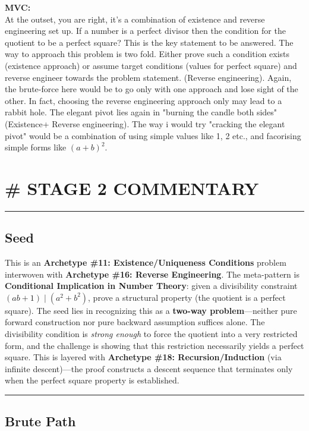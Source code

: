 \documentclass{article}
\begin{document}
\noindent \textbf{MVC:} \\
At the outset, you are right, it's a combination of existence and reverse engineering set up. If a number is a perfect divisor then the condition for the quotient to be a perfect square? This is the key statement to be answered. The way to approach this problem is two fold. Either prove such a condition exists (existence approach) or assume target conditions (values for perfect square) and reverse engineer towards the problem statement. (Reverse engineering). Again, the brute-force here would be to go only with one approach and lose sight of the other. In fact, choosing the reverse engineering approach only may lead to a rabbit hole. The elegant pivot lies again in "burning the candle both sides" (Existence+ Reverse engineering). The way i would try "cracking the elegant pivot" would be a combination of using simple values like 1, 2 etc., and facorising simple forms like $(a+b)^2$. \\

\section*{\# STAGE 2 COMMENTARY}

\noindent \rule{\textwidth}{0.4pt}

\subsection*{Seed}

This is an \textbf{Archetype \#11: Existence/Uniqueness Conditions} problem interwoven with \textbf{Archetype \#16: Reverse Engineering}. The meta-pattern is \textbf{Conditional Implication in Number Theory}: given a divisibility constraint $(ab + 1) \mid (a^2 + b^2)$, prove a structural property (the quotient is a perfect square). The seed lies in recognizing this as a \textbf{two-way problem}—neither pure forward construction nor pure backward assumption suffices alone. The divisibility condition is \textit{strong enough} to force the quotient into a very restricted form, and the challenge is showing that this restriction necessarily yields a perfect square. This is layered with \textbf{Archetype \#18: Recursion/Induction} (via infinite descent)—the proof constructs a descent sequence that terminates only when the perfect square property is established.

\noindent \rule{\textwidth}{0.4pt}

\subsection*{Brute Path}
\end{document}
